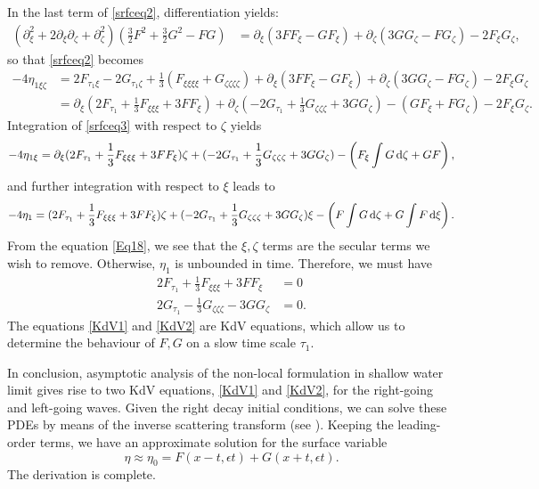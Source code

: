In the last term of \eqref{srfceq2}, differentiation yields:
\begin{align*}
(\partial_\xi^2 + 2\partial_\xi \partial_\zeta + \partial_\zeta^2) \left(\frac{3}{2} F^2  + \frac{3}{2}G^2 - FG\right) &= \partial_\xi(3 F F_\xi - G F_\xi) + \partial_\zeta(3 G G_\zeta - F G_\zeta) - 2 F_\xi G_\zeta,
\end{align*}
so that \eqref{srfceq2} becomes
\begin{align}
- 4\eta_{1\xi \zeta} &= 2F_{\tau_1 \xi} - 2G_{\tau_1 \zeta} + \frac{1}{3}(F_{\xi\xi\xi\xi} + G_{\zeta\zeta\zeta\zeta}) + \partial_\xi(3 F F_\xi - G F_\xi) + \partial_\zeta(3 G G_\zeta - F G_\zeta) - 2 F_\xi G_\zeta \nonumber \\
&= \partial_\xi(2F_{\tau_1} + \frac{1}{3}F_{\xi\xi\xi} + 3 F F_\xi) + \partial_\zeta(- 2G_{\tau_1} +  \frac{1}{3}G_{\zeta\zeta\zeta} + 3 G G_\zeta) - (G F_\xi  + F G_\zeta) - 2 F_\xi G_\zeta. \label{srfceq3}
\end{align}
Integration of \eqref{srfceq3} with respect to $\zeta$ yields
\[ 
- 4\eta_{1\xi} = \partial_\xi(2F_{\tau_1} + \frac{1}{3}F_{\xi\xi\xi} + 3 F F_\xi) \zeta + (- 2G_{\tau_1} +  \frac{1}{3}G_{\zeta\zeta\zeta} + 3 G G_\zeta) - \left(F_\xi \int G \,\mathrm{d} \zeta   + G F\right),
\]
and further integration with respect to $\xi$ leads to
\begin{equation}\label{Eq18}
- 4\eta_{1} = (2F_{\tau_1} + \frac{1}{3}F_{\xi\xi\xi} + 3 F F_\xi) \zeta + (- 2G_{\tau_1} +  \frac{1}{3}G_{\zeta\zeta\zeta}+ 3 G G_\zeta) \xi - \left(F \int G \,\mathrm{d} \zeta  + G \int F \,\mathrm{d} \xi \right).
\end{equation}
From the equation \eqref{Eq18}, we see that the $\xi, \zeta$ terms are the secular terms we wish to remove. Otherwise, $\eta_1$ is unbounded in time. Therefore, we must have 
\begin{align}
2F_{\tau_1} + \frac{1}{3}F_{\xi\xi\xi} + 3 F F_\xi &= 0 \label{KdV1} \\
2G_{\tau_1} - \frac{1}{3}G_{\zeta\zeta\zeta} -  3 G G_\zeta &= 0. \label{KdV2}
\end{align}
The equations \eqref{KdV1} and \eqref{KdV2} are KdV equations, which allow us to determine the behaviour of $F, G$ on a slow time scale $\tau_1.$ 

In conclusion, asymptotic analysis of the non-local formulation in shallow water limit gives rise to two KdV equations, \eqref{KdV1} and \eqref{KdV2}, for the right-going and left-going waves. Given the right decay initial conditions, we can solve these PDEs by means of the inverse scattering transform (see \cite[Chapter 9]{Ablowitz}). Keeping the leading-order terms, we have an approximate solution for the surface variable
\[ \eta \approx \eta_0 = F(x- t, \epsilon t) + G(x + t, \epsilon t).\]
The derivation is complete.